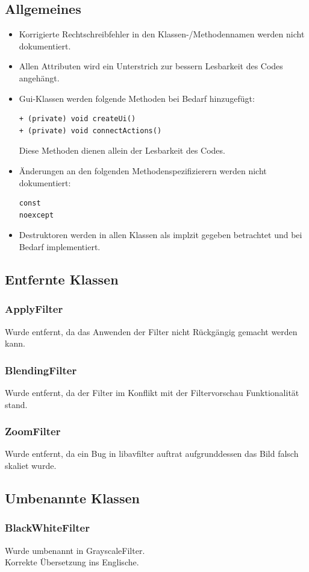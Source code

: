 \documentclass{scrartcl}
\begin{document}
{\subsection{Allgemeines}
\bigskip
\begin{itemize}
\item Korrigierte Rechtschreibfehler in den Klassen-/Methodennamen werden nicht dokumentiert.
\item Allen Attributen wird ein Unterstrich zur bessern Lesbarkeit des Codes angehängt.
\item Gui-Klassen werden folgende Methoden bei Bedarf hinzugefügt:
\begin{verbatim}
+ (private) void createUi()
+ (private) void connectActions()
\end{verbatim}
Diese Methoden dienen allein der Lesbarkeit des Codes.
\item Änderungen an den folgenden Methodenspezifizierern werden nicht dokumentiert:
\begin{verbatim}
const
noexcept
\end{verbatim}
\item Destruktoren werden in allen Klassen als implzit gegeben betrachtet und bei Bedarf implementiert.
\end{itemize}
\newpage
\subsection{Entfernte Klassen}
\bigskip
\subsubsection{ApplyFilter}
Wurde entfernt, da das Anwenden der Filter nicht Rückgängig gemacht werden kann.
\subsubsection{BlendingFilter}
Wurde entfernt, da der Filter im Konflikt mit der Filtervorschau Funktionalität stand.
\subsubsection{ZoomFilter}
Wurde entfernt, da ein Bug in libavfilter auftrat aufgrunddessen das Bild falsch skaliet wurde.
\bigskip
\subsection{Umbenannte Klassen}
\bigskip
\subsubsection{BlackWhiteFilter}
Wurde umbenannt in GrayscaleFilter.\\
Korrekte Übersetzung ins Englische.
\newpage
}
\end{document}
